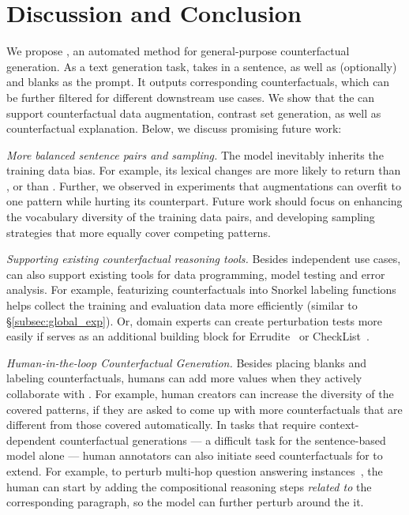 \section{Discussion and Conclusion}
\label{sec:discuss}

We propose \sysname, an automated method for general-purpose counterfactual generation. 
As a text generation task, \sysname takes in a sentence, as well as (optionally) \tagstrs and blanks as the prompt.
It outputs corresponding counterfactuals, which can be further filtered for different downstream use cases. 
We show that the \sysname can support counterfactual data augmentation, contrast set generation, as well as counterfactual explanation.
Below, we discuss promising future work:

\emph{More balanced sentence pairs and sampling.}
The \sysname model inevitably inherits the training data bias.
For example, its lexical changes are more likely to return  than , or  than .
Further, we observed in \qqp experiments that augmentations can overfit to one pattern while hurting its counterpart. 
Future work should focus on enhancing the vocabulary diversity of the training data pairs, and developing sampling strategies that more equally cover competing patterns.

\emph{Supporting existing counterfactual reasoning tools.}
Besides independent use cases, \sysname can also support existing tools for data programming, model testing and error analysis.
For example, featurizing counterfactuals into Snorkel labeling functions~\cite{ratner2017snorkel} helps collect the training and evaluation data more efficiently (similar to \S\ref{subsec:global_exp}).
Or, domain experts can create perturbation tests more easily if \sysname serves as an additional building block for Errudite~\cite{wu2019errudite} or CheckList~\cite{checklist:acl20}.


\emph{Human-in-the-loop Counterfactual Generation.}
Besides placing blanks and labeling counterfactuals, humans can add more values when they actively collaborate with \sysname.
For example, human creators can increase the diversity of the covered patterns, if they are asked to come up with more counterfactuals that are different from those covered automatically.
In tasks that require context-dependent counterfactual generations --- a difficult task for the sentence-based model alone --- human annotators can also initiate seed counterfactuals for \sysname to extend.
For example, to perturb multi-hop question answering instances~\cite{gardner2020contrast}, the human can start by adding the compositional reasoning steps \emph{related to} the corresponding paragraph, so the model can further perturb around the it.